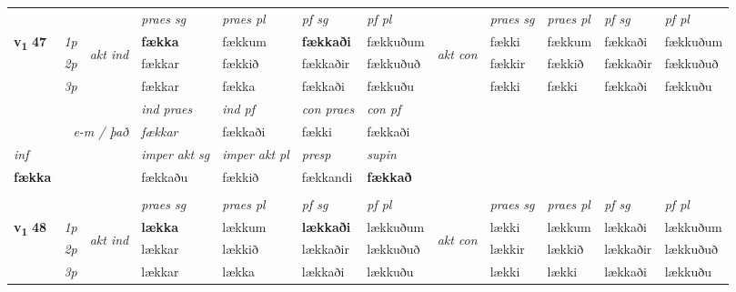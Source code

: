 \begin{longtable}[l]{X>{\footnotesize\itshape}llXXXXlXXXX}
 & &   & \textit{praes sg}  & \textit{praes pl}    & \textit{ pf sg} & \textit{pf pl} & & \textit{praes sg}  & \textit{praes pl}    & \textit{pf sg} & \textit{pf pl }  \\ \cmidrule{4-7} \cmidrule{9-12}
 \multirow{2}{*}{{{\textbf{v{\textsubscript{1}}} \Large{\textbf{47}}}}}  & 1p & \multirow{3}{*}{\begin{turn}{90}\textit{akt ind}\end{turn}} & \textbf{fækka} & fækkum & \textbf{fækkaði} & fækkuðum & \multirow{3}{*}{\begin{turn}{90}\textit{akt con}\end{turn}} &fækki & fækkum & fækkaði & fækkuðum\\*
 & 2p &  &  fækkar  & fækkið & fækkaðir & fækkuðuð & & fækkir & fækkið & fækkaðir & fækkuðuð \\*
 & 3p &  & fækkar & fækka & fækkaði & fækkuðu & & fækki & fækki& fækkaði & fækkuðu \\*
\cmidrule{4-7} \cmidrule{9-12}

   && &  \textit{ind praes} & \textit{ind pf} & \textit{con praes} & \textit{con pf} \\*
\multicolumn{3}{r}{\textit{e-m / það}} & fækkar & fækkaði & fækki & fækkaði \\*

\cmidrule{4-7}
   {\textit{inf}} & &  & \textit{imper akt sg} & \textit{imper akt pl}   & \textit{presp} & \textit{supin}   \\*
  {\textbf{fækka}} & && fækkaðu  & fækkið   & fækkandi &  \textbf{fækkað}   \\*

\midrule


  & \\
   \midrule
 & &   & \textit{praes sg}  & \textit{praes pl}    & \textit{ pf sg} & \textit{pf pl} & & \textit{praes sg}  & \textit{praes pl}    & \textit{pf sg} & \textit{pf pl }  \\ \cmidrule{4-7} \cmidrule{9-12}
 \multirow{2}{*}{{{\textbf{v{\textsubscript{1}}} \Large{\textbf{48}}}}}  & 1p & \multirow{3}{*}{\begin{turn}{90}\textit{akt ind}\end{turn}} & \textbf{lækka} & lækkum & \textbf{lækkaði} & lækkuðum & \multirow{3}{*}{\begin{turn}{90}\textit{akt con}\end{turn}} &lækki & lækkum & lækkaði & lækkuðum\\*
 & 2p &  &  lækkar  & lækkið & lækkaðir & lækkuðuð & & lækkir & lækkið & lækkaðir & lækkuðuð \\*
 & 3p &  & lækkar & lækka & lækkaði & lækkuðu & & lækki & lækki& lækkaði & lækkuðu \\*
\cmidrule{4-7} \cmidrule{9-12}


\end{longtable}
